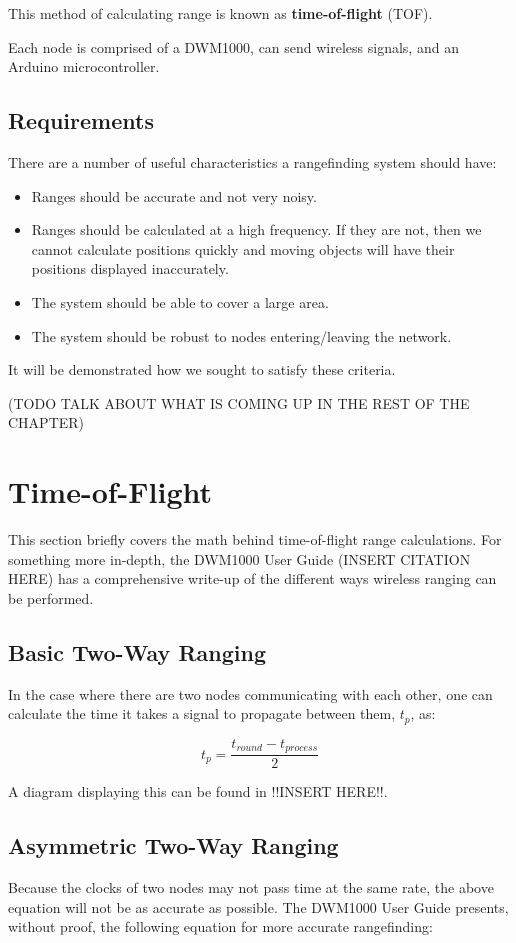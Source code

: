 This method of calculating range is known as \textbf{time-of-flight} (TOF).

Each node is comprised of a DWM1000, can send wireless signals, and an Arduino microcontroller.

\subsection{Requirements}
There are a number of useful characteristics a rangefinding system should have:
\begin{itemize}
	\item Ranges should be accurate and not very noisy.
	\item Ranges should be calculated at a high frequency. If they are not, then we cannot calculate positions quickly and moving objects will have their positions displayed inaccurately.
	\item The system should be able to cover a large area. 
	\item The system should be robust to nodes entering/leaving the network. 
\end{itemize}

It will be demonstrated how we sought to satisfy these criteria.

(TODO TALK ABOUT WHAT IS COMING UP IN THE REST OF THE CHAPTER)

\section{Time-of-Flight}
This section briefly covers the math behind time-of-flight range calculations. For something more in-depth, the DWM1000 User Guide (INSERT CITATION HERE) has a comprehensive write-up of the different ways wireless ranging can be performed.

\subsection{Basic Two-Way Ranging}
In the case where there are two nodes communicating with each other, one can calculate the time it takes a signal to propagate between them, $t_p$, as:

\[
	t_p = \frac{t_{round} - t_{process}}{2}
\]

A diagram displaying this can be found in !!INSERT HERE!!.

\subsection{Asymmetric Two-Way Ranging}
Because the clocks of two nodes may not pass time at the same rate, the above equation will not be as accurate as possible. The DWM1000 User Guide presents, without proof, the following equation for more accurate rangefinding:

